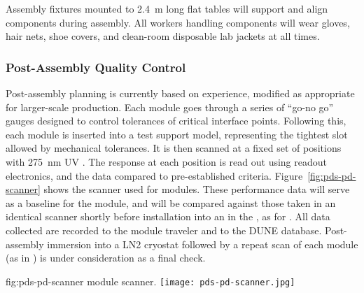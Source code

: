 Assembly fixtures mounted to \SI{2.4}{m} long flat tables will %
support and align  components during assembly.  All workers handling  components will wear gloves, hair nets, shoe covers, and clean-room disposable lab jackets at all times.

\subsubsection{Post-Assembly Quality Control}

Post-assembly  planning is currently based on  experience, modified as appropriate for larger-scale production.  Each  module goes through a series of ``go-no go'' gauges 
designed to control tolerances of critical interface points.  Following this, each module is inserted into a test  support model, representing the tightest slot allowed by  mechanical tolerances. %
It is then scanned at a fixed set of positions 
with \SI{275}{nm} UV .  The   response at each position is read out using  readout electronics, and the data compared to pre-established criteria.  Figure~\ref{fig:pds-pd-scanner} shows %
the scanner used for  modules. These performance data will serve as a baseline for the  module, and will be compared against those taken in an identical scanner shortly before installation into an  in the , as for . %
All data collected are recorded to the module traveler and to the DUNE  database.
Post-assembly immersion into a LN2 cryostat followed by a repeat scan of each  module (as in ) is under consideration as a final  check.

\begin{dunefigure}{fig:pds-pd-scanner}
{ module scanner.}
  \texttt{[image: pds-pd-scanner.jpg]}
\end{dunefigure}


